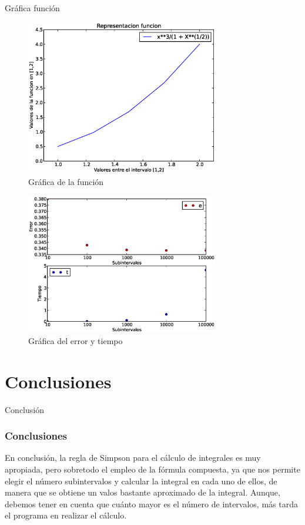 \documentclass{beamer}
\begin{document}
\begin{frame}{Gráfica función}
  \begin{figure}[ptb]
    \begin{center}
      \includegraphics[width=0.75\textwidth]{tmp2.eps}
      \caption{Gráfica de la función}
      \label{fig:1}
    \end{center}
  \end{figure}
\end{frame}  
  
\begin{frame}
  \begin{figure}[h]
    \begin{center}
      \includegraphics[width=0.75\textwidth]{errortiemp.eps}
      \caption{Gráfica del error y tiempo}
      \label{fig:2}
    \end{center}
  \end{figure}
\end{frame}

\section{Conclusiones}
\begin{frame}{Conclusión}
  \frametitle{Conclusiones}
  En conclusión, la regla de Simpson para el cálculo de integrales es muy apropiada, pero sobretodo el empleo de la fórmula 
compuesta, ya que nos permite elegir el número subintervalos y calcular la integral en cada uno de ellos, de manera que se 
obtiene un valos bastante aproximado de la integral. Aunque, debemos tener en cuenta que cuánto mayor es el número de intervalos,
más tarda el programa en realizar el cálculo. 
  
\end{frame}
\end{document}
